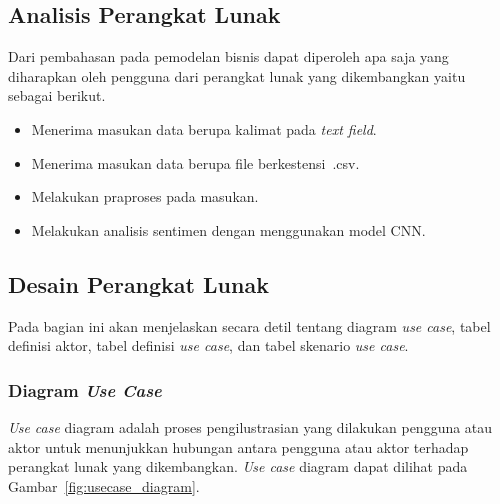 \subsection{Analisis Perangkat Lunak}
Dari pembahasan pada pemodelan bisnis dapat diperoleh apa saja yang diharapkan oleh pengguna dari
perangkat lunak yang dikembangkan yaitu sebagai berikut.
\begin{itemize}
  \item Menerima masukan data berupa kalimat pada \emph{text field}.
  \item Menerima masukan data berupa file berkestensi~.csv.
  \item Melakukan praproses pada masukan.
  \item Melakukan analisis sentimen dengan menggunakan model CNN\@.
\end{itemize}

\subsection{Desain Perangkat Lunak}
Pada bagian ini akan menjelaskan secara detil tentang diagram \emph{use case}, tabel definisi aktor, tabel
definisi \emph{use case}, dan tabel skenario \emph{use case}.

\subsubsection{Diagram \emph{Use Case}}
\emph{Use case} diagram adalah proses pengilustrasian yang dilakukan pengguna atau aktor untuk menunjukkan hubungan
antara pengguna atau aktor terhadap perangkat lunak yang dikembangkan. \emph{Use case} diagram dapat dilihat
pada Gambar~\ref{fig:usecase_diagram}.

